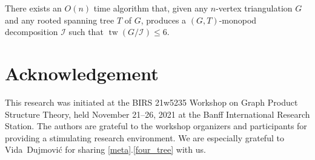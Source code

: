 \documentclass{patmorin}
\DeclareMathOperator{\tw}{tw}
\begin{document}
\begin{thm}\label{monopod_decomposition_algorithm}
  There exists an $O(n)$ time algorithm that, given any $n$-vertex triangulation $G$ and any rooted spanning tree $T$ of $G$, produces a $(G,T)$-monopod decomposition $\mathcal{I}$ such that $\tw(G/\mathcal{I})\le 6$.
\end{thm}


\section*{Acknowledgement}

This research was initiated at the BIRS 21w5235 Workshop on Graph Product Structure Theory, held November 21--26, 2021 at the Banff International Research Station.  The authors are grateful to the workshop organizers and participants for providing a stimulating research environment.  We are especially grateful to Vida~Dujmović for sharing \cref{meta}.\ref{four_tree} with us.




\end{document}

